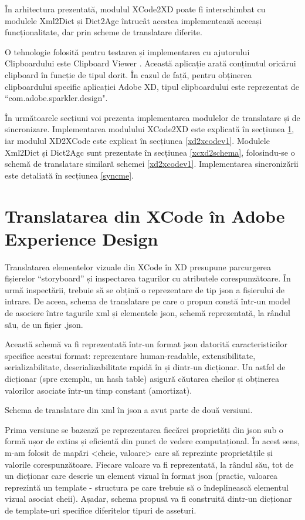 În arhitectura prezentată, modulul XCode2XD poate fi interschimbat cu modulele Xml2Dict și Dict2Agc întrucât acestea implementează aceeași funcționalitate, dar prin scheme de translatare diferite.

O tehnologie folosită pentru testarea și implementarea cu ajutorului Clipboardului este Clipboard Viewer \cite{clipboard}. Această aplicație arată conținutul oricărui clipboard în funcție de tipul dorit. În cazul de față, pentru obținerea clipboardului specific aplicației Adobe XD, tipul clipboardului este reprezentat de ``com.adobe.sparkler.design".


În următoarele secțiuni voi prezenta implementarea modulelor de translatare și de sincronizare.
Implementarea modulului XCode2XD este explicată în secțiunea \ref{xcode2xdv1}, iar modulul XD2XCode este explicat în secțiunea \ref{xd2xcodev1}. Modulele Xml2Dict și Dict2Agc sunt prezentate în secțiunea \ref{xcxd2schema}, folosindu-se o schemă de translatare similară schemei \ref{xd2xcodev1}. Implementarea sincronizării este detaliată în secțiunea \ref{syncme}.


\section{Translatarea din XCode în Adobe Experience Design} \label{xcode2xdv1}

Translatarea elementelor vizuale din XCode în XD presupune parcurgerea fișierelor “storyboard” și inspectarea tagurilor cu atributele corespunzătoare. În urmă inspectării, trebuie să se obțină o reprezentare de tip json a fișierului de intrare.  De aceea, schema de translatare pe care o propun constă într-un model de asociere între tagurile xml și elementele json, schemă reprezentată, la rândul său, de un fișier .json.  

Această schemă va fi reprezentată într-un format json datorită caracteristicilor specifice acestui format: reprezentare human-readable, extensibilitate, serializabilitate, deserializabilitate rapidă în și dintr-un dicționar. Un astfel de dicționar (spre exemplu, un hash table) asigură căutarea cheilor și obținerea valorilor asociate într-un timp constant (amortizat).

Schema de translatare din xml în json a avut parte de două versiuni. 

Prima versiune se bazează pe reprezentarea fiecărei proprietăți din json sub o formă ușor de extins și eficientă din punct de vedere computațional. În acest sens, m-am folosit de mapări <cheie, valoare> care să reprezinte proprietățile și valorile corespunzătoare. Fiecare valoare va fi reprezentată, la rândul său, tot de un dicționar care descrie un element vizual în format json (practic, valoarea reprezintă un template - structura pe care trebuie să o îndeplinească elementul vizual asociat cheii). Așadar, schema propusă va fi construită dintr-un dicționar de template-uri specifice diferitelor tipuri de asseturi.

